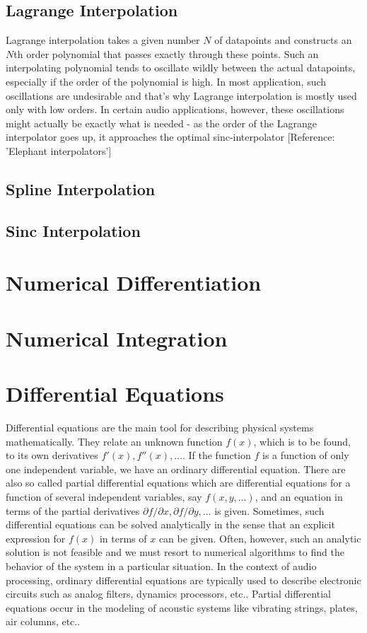 \subsection{Lagrange Interpolation}
Lagrange interpolation takes a given number $N$ of datapoints and constructs an $N$th order polynomial that passes exactly through these points. Such an interpolating polynomial tends to oscillate wildly between the actual datapoints, especially if the order of the polynomial is high. In most application, such oscillations are undesirable and that's why Lagrange interpolation is mostly used only with low orders. In certain audio applications, however, these oscillations might actually be exactly what is needed - as the order of the Lagrange interpolator goes up, it approaches the optimal sinc-interpolator [Reference: 'Elephant interpolators']

\subsection{Spline Interpolation}


\subsection{Sinc Interpolation}



\section{Numerical Differentiation}

\section{Numerical Integration}

\section{Differential Equations}
Differential equations are the main tool for describing physical systems mathematically. They relate an unknown function $f(x)$, which is to be found, to its own derivatives $f'(x), f''(x), \ldots$. If the function $f$ is a function of only one independent variable, we have an ordinary differential equation. There are also so called partial differential equations which are differential equations for a function of several independent variables, say $f(x,y,\ldots)$, and an equation in terms of the partial derivatives $\partial f / \partial x, \partial f / \partial y, \ldots$ is given. Sometimes, such differential equations can be solved analytically in the sense that an explicit expression for $f(x)$ in terms of $x$ can be given. Often, however, such an analytic solution is not feasible and we must resort to numerical algorithms to find the behavior of the system in a particular situation. In the context of audio processing, ordinary differential equations are typically used to describe electronic circuits such as analog filters, dynamics processors, etc.. Partial differential equations occur in the modeling of acoustic systems like vibrating strings, plates, air columns, etc..

